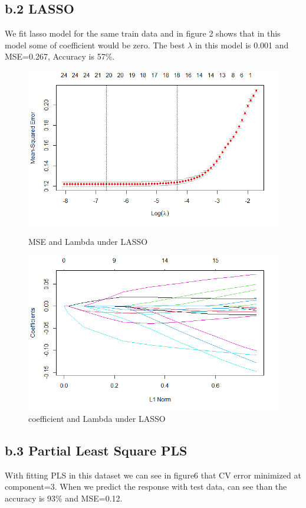 \documentclass[a4paper, 11pt]{article}
\begin{document}
\subsection*{b.2 LASSO }
We fit lasso model for the same train data and in figure 2 shows that in this model some of coefficient would be zero. The best $\lambda$ in this model is 0.001 and MSE=0.267, Accuracy is 57\%. 
\begin{figure}[H]
\centering
\begin{minipage}[b]{0.4\textwidth}
\includegraphics[width=\textwidth]{figure4.png}
\caption{MSE and Lambda under LASSO }
\end{minipage}
\begin{minipage}[b]{0.4\textwidth}
\includegraphics[width=\textwidth]{figure2.png}
\caption{coefficient and Lambda under LASSO }
\end{minipage}
\end{figure}

\subsection*{b.3 Partial Least Square PLS }
With fitting PLS in this dataset we can see in figure6 that CV error minimized at component=3. When we predict the response with test data, can see than the accuracy is 93\% and MSE=0.12.\newline
\end{document}

